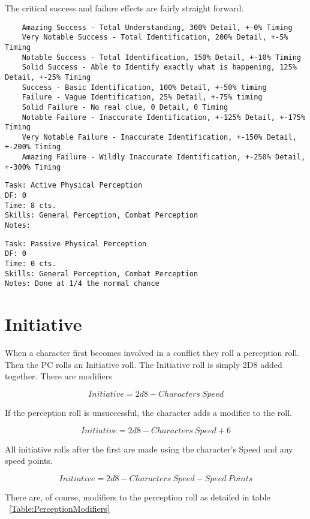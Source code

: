 The critical success and failure effects are fairly straight forward. 

\begin{verbatim}
	Amazing Success - Total Understanding, 300% Detail, +-0% Timing
	Very Notable Success - Total Identification, 200% Detail, +-5% Timing
    Notable Success - Total Identification, 150% Detail, +-10% Timing
	Solid Success - Able to Identify exactly what is happening, 125% Detail, +-25% Timing
	Success - Basic Identification, 100% Detail, +-50% timing
	Failure - Vague Identification, 25% Detail, +-75% timing
	Solid Failure - No real clue, 0 Detail, 0 Timing
	Notable Failure - Inaccurate Identification, +-125% Detail, +-175% Timing
	Very Notable Failure - Inaccurate Identification, +-150% Detail, +-200% Timing
	Amazing Failure - Wildly Inaccurate Identification, +-250% Detail, +-300% Timing
\end{verbatim}

\begin{verbatim}
Task: Active Physical Perception  
DF: 0 
Time: 8 cts. 
Skills: General Perception, Combat Perception
Notes: 
\end{verbatim}

\begin{verbatim}
Task: Passive Physical Perception  
DF: 0 
Time: 0 cts. 
Skills: General Perception, Combat Perception
Notes: Done at 1/4 the normal chance 
\end{verbatim}



\section{Initiative}

When a character first becomes involved in a conflict they
roll a perception roll. Then the PC rolls an {Initiative} roll. The 
Initiative roll is simply 2D8 added together. There are modifiers 

\[{Initiative} = 2d8 - {Characters\ Speed}\]

If the perception roll is unsuccessful, the character adds a modifier 
to the roll. 

\[{Initiative} = 2d8 - {Characters\ Speed} + 6\]

All initiative rolls after the first are made using the character's 
Speed and any speed points.

\[{Initiative} = 2d8 - {Characters\ Speed} - {Speed\ Points}\]

There are, of course, modifiers to the perception roll as detailed in table 
~\ref{Table:PerceptionModifiers}

